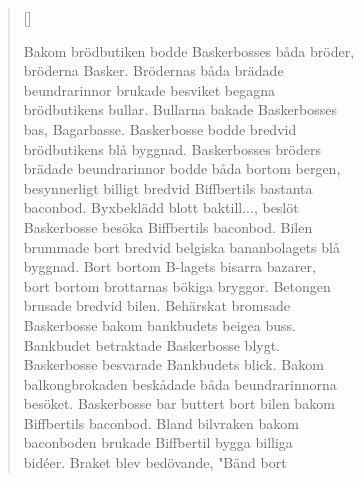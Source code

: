 
\settowidth{\versewidth}{Bakom brödbutiken bodde Baskerbosses båda bröder,}



\begin{verse}[\versewidth]


Bakom brödbutiken bodde Baskerbosses båda bröder,\\
bröderna Basker. Brödernas båda brädade\\
beundrarinnor brukade besviket begagna\\
brödbutikens bullar. Bullarna bakade Baskerbosses\\
bas, Bagarbasse. Baskerbosse bodde bredvid\\
brödbutikens blå byggnad. Baskerbosses bröders\\
brädade beundrarinnor bodde båda bortom bergen,\\
besynnerligt billigt bredvid Biffbertils bastanta\\
baconbod. Byxbeklädd blott baktill..., beslöt\\
Baskerbosse besöka Biffbertils baconbod. Bilen\\
brummade bort bredvid belgiska bananbolagets blå\\
byggnad. Bort bortom B-lagets bisarra bazarer,\\
bort bortom brottarnas bökiga bryggor. Betongen\\
brusade bredvid bilen. Behärskat bromsade\\
Baskerbosse bakom bankbudets beigea buss.\\
Bankbudet betraktade Baskerbosse blygt.\\
Baskerbosse besvarade Bankbudets blick. Bakom\\
balkongbrokaden beskådade båda beundrarinnorna\\
besöket. Baskerbosse bar buttert bort bilen bakom\\
Biffbertils baconbod. Bland bilvraken bakom\\
baconboden brukade Biffbertil bygga billiga\\
bidéer. Braket blev bedövande, "Bänd bort\\

\end{verse}

